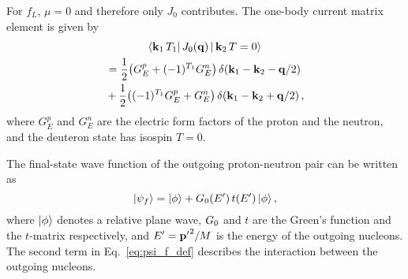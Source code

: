 	For $f_L$, $\mu = 0$ and therefore only $J_0$ contributes.
	The one-body current matrix element is given by
	\begin{multline}
	 \la \mbf{k}_1 \, T_1| \, J_0(\mbf{q}) \, | \,\mbf{k}_2 \, T=0 \ra \\
	 = \frac{1}{2} \big(G_E^p + (-1)^{T_1} G_E^n\big) \,
	 \delta(\mbf{k}_1 - \mbf{k}_2 - \mbf{q}/2) \\
	 \null + \frac{1}{2} \big((-1)^{T_1} G_E^p +  G_E^n\big) \, \delta(\mbf{k}_1
	 - \mbf{k}_2 + \mbf{q}/2) \,,
	\label{eq:J0_def}
	\end{multline}
	where $G_E^p$ and $G_E^n$ are the electric form factors of the proton and the
	neutron, and the deuteron state has isospin $T=0$.

	The final-state wave function of the outgoing proton-neutron pair can be
	written	as
	\begin{equation}
	 |\psi_f\rangle = | \phi \rangle + G_0 (E^\prime) \, t(E^\prime) \,| \phi \rangle \,,
	\label{eq:psi_f_def}
	\end{equation}
	where ${|\phi\rangle}$ denotes a relative plane wave, $G_0$ and $t$
	are the Green's function and the $t$-matrix respectively, and  $E^\prime =
	\mathbf{p^\prime}^2/M$ is the energy of the outgoing nucleons.  The second term in
	Eq.~\eqref{eq:psi_f_def} describes the interaction between the outgoing
	nucleons.

